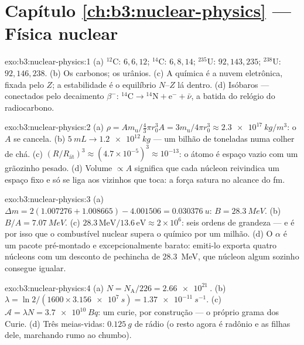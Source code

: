 \section*{Capítulo \ref{ch:b3:nuclear-physics} --- Física nuclear}

\begin{solution}{exo:b3:nuclear-physics:1}
(a) $^{12}$C: $6, 6, 12$; $^{14}$C: $6, 8, 14$; $^{235}$U:
$92, 143, 235$; $^{238}$U: $92, 146, 238$. (b) Os carbonos; os
urânios. (c) A química é a nuvem eletrônica, fixada pelo $Z$;
a estabilidade é o equilíbrio $N$--$Z$ lá dentro. (d) Isóbaros ---
conectados pelo decaimento $\beta^-$: $^{14}\text{C} \to {}^{14}\text{N}
+ \text{e}^- + \bar\nu$, a batida do relógio do radiocarbono.
\end{solution}

\begin{solution}{exo:b3:nuclear-physics:2}
(a) $\rho = Am_{\text{u}}/\tfrac43\pi r_0^3A =
3m_{\text{u}}/4\pi r_0^3 \approx \qty{2.3e17}{kg/m^3}$: o $A$
se cancela. (b) $\qty{5}{mL} \to \qty{1.2e12}{kg}$ --- um bilhão
de toneladas numa colher de chá. (c) $(R/R_{\text{át}})^3 \approx
(4.7\times10^{-5})^3 \approx 10^{-13}$: o átomo é espaço vazio
com um grãozinho pesado. (d) Volume $\propto A$ significa que cada
núcleon reivindica um espaço fixo e só se liga aos vizinhos que toca: a
força satura no alcance do \unit{fm}.
\end{solution}

\begin{solution}{exo:b3:nuclear-physics:3}
(a) $\Delta m = 2(1.007276 + 1.008665) - 4.001506 =
\qty{0.030376}{u}$: $B = \qty{28.3}{MeV}$. (b) $B/A =
\qty{7.07}{MeV}$. (c) $28.3\,\text{MeV}/13.6\,\text{eV} \approx
2\times10^6$: seis ordens de grandeza --- e é por isso que o combustível
nuclear supera o químico por um milhão. (d) O $\alpha$ é um
pacote pré-montado e excepcionalmente barato: emiti-lo exporta
quatro núcleons com um desconto de pechincha de \qty{28.3}{MeV}, que
núcleon algum sozinho consegue igualar.
\end{solution}

\begin{solution}{exo:b3:nuclear-physics:4}
(a) $N = N_{\text{A}}/226 = \qty{2.66e21}{}$. (b) $\lambda =
\ln2/(1600\times\qty{3.156e7}{s}) = \qty{1.37e-11}{s^{-1}}$. (c)
$\mathcal A = \lambda N = \qty{3.7e10}{Bq}$: um curie, por
construção --- o próprio grama dos Curie. (d) Três meias-vidas:
$\qty{0.125}{g}$ de rádio (o resto agora é radônio e as
filhas dele, marchando rumo ao chumbo).
\end{solution}

